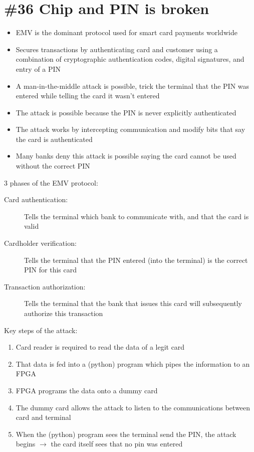 \section{\#36 Chip and PIN is broken}
\begin{itemize}
	\item EMV is the dominant protocol used for smart card payments worldwide
	\item Secures transactions by authenticating card and customer using a combination of cryptographic authentication codes, digital signatures, and entry of a PIN
	\item A man-in-the-middle attack is possible, trick the terminal that the PIN was entered while telling the card it wasn't entered
	\item The attack is possible because the PIN is never explicitly authenticated
	\item The attack works by intercepting communication and modify bits that say the card is authenticated
	\item Many banks deny this attack is possible saying the card cannot be used without the correct PIN
\end{itemize}
3 phases of the EMV protocol:
\begin{description}
	\item[Card authentication:] Tells the terminal which bank to communicate with, and that the card is valid
	\item[Cardholder verification:] Tells the terminal that the PIN entered (into the terminal) is the correct PIN for this card
	\item[Transaction authorization:] Tells the terminal that the bank that issues this card will subsequently authorize this transaction
\end{description}
Key steps of the attack:
\begin{enumerate}
	\item Card reader is required to read the data of a legit card
	\item That data is fed into a (python) program which pipes the information to an FPGA
	\item FPGA programs the data onto a dummy card
	\item The dummy card allows the attack to listen to the communications between card and terminal
	\item When the (python) program sees the terminal send the PIN, the attack begins $\rightarrow$ the card itself sees that no pin was entered
\end{enumerate}